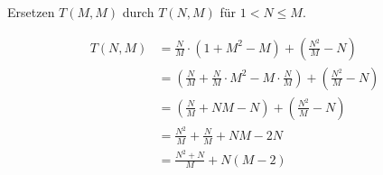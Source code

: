 \documentclass[parskip=half,a4paper]{scrartcl}
\begin{document}
\begin{center}
Ersetzen $T(M,M)$ durch $T(N,M)$ für $1 < N \le M$.
\end{center}

\begin{equation*}
\begin{aligned}
    T(N, M) & =  \frac{N}{M} \cdot \left(1 + M^2 - M\right) + \left(\frac{N^2}{M} - N\right) \\
    & =  \left(\frac{N}{M} + \frac{N}{M} \cdot M^2 - M \cdot \frac{N}{M}\right) + \left(\frac{N^2}{M} - N\right) \\
    & =  \left(\frac{N}{M} + NM - N\right) + \left(\frac{N^2}{M} - N\right) \\
    & =  \frac{N^2}{M} + \frac{N}{M} + NM - 2N \\
    & =  \frac{N^2 + N}{M} + N \left( M-2 \right) \\
\end{aligned}
\end{equation*}
\end{document}
